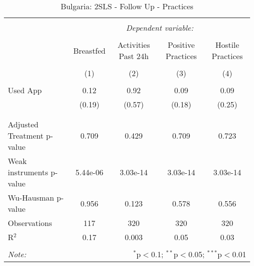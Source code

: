
\begin{table}[!htbp] \centering 
  \caption{Bulgaria: 2SLS - Follow Up - Practices} 
  \label{tbl:Bulgaria: 2SLS - Follow Up - Practices} 
\begin{tabular}{@{\extracolsep{5pt}}lcccc} 
\\[-1.8ex]\hline 
\hline \\[-1.8ex] 
 & \multicolumn{4}{c}{\textit{Dependent variable:}} \\ 
\cline{2-5} 
\\[-1.8ex] & Breastfed & Activities Past 24h & Positive Practices & Hostile Practices \\ 
\\[-1.8ex] & (1) & (2) & (3) & (4)\\ 
\hline \\[-1.8ex] 
 Used App & 0.12 & 0.92 & 0.09 & 0.09 \\ 
  & (0.19) & (0.57) & (0.18) & (0.25) \\ 
  & & & & \\ 
\hline \\[-1.8ex] 
Adjusted Treatment p-value & 0.709 & 0.429 & 0.709 & 0.723 \\ 
Weak instruments p-value & 5.44e-06 & 3.03e-14 & 3.03e-14 & 3.03e-14 \\ 
Wu-Hausman p-value & 0.956 & 0.123 & 0.578 & 0.556 \\ 
Observations & 117 & 320 & 320 & 320 \\ 
R$^{2}$ & 0.17 & 0.003 & 0.05 & 0.03 \\ 
\hline 
\hline \\[-1.8ex] 
\textit{Note:}  & \multicolumn{4}{r}{$^{*}$p$<$0.1; $^{**}$p$<$0.05; $^{***}$p$<$0.01} \\ 
\end{tabular} 
\end{table} 
